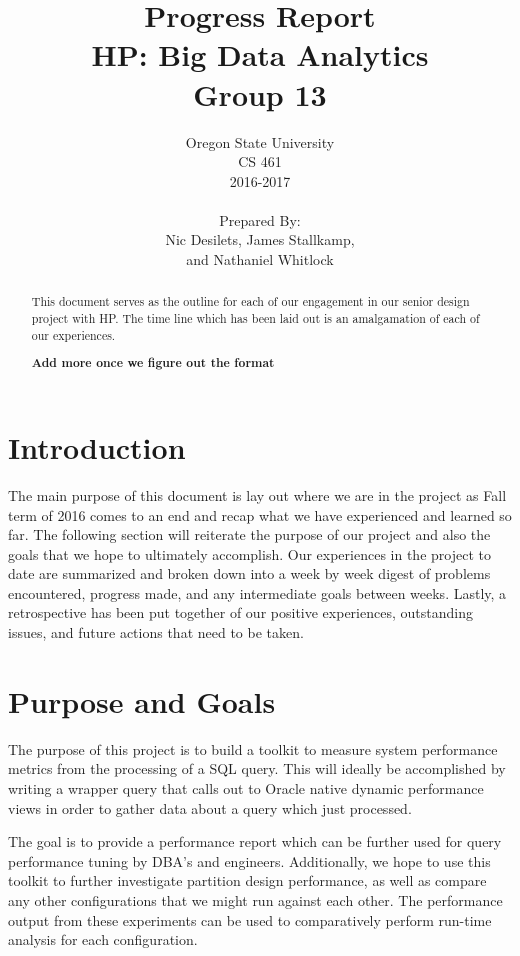 \documentclass[draftclsnofoot, onecolumn, compsoc, 10pt]{IEEEtran}
\title{\Huge Progress Report\\\large HP: Big Data Analytics\\Group 13}
\author{Oregon State University\\CS 461\\2016-2017\\\\Prepared By:\\Nic Desilets, James Stallkamp,\\and Nathaniel Whitlock}
\begin{document}
\begin{titlingpage}
    \maketitle 
    
    \vspace{1in}
    \begin{abstract}
		\noindent This document serves as the outline for each of our engagement in our senior design project with HP. The time line which has been laid out is an amalgamation of each of our experiences.
        
        \bf{Add more once we figure out the format}
    \end{abstract}
\end{titlingpage}

{\small\tableofcontents} %
\pagebreak

\section{Introduction}
The main purpose of this document is lay out where we are in the project as Fall term of 2016 comes to an end and recap what we have experienced and learned so far. The following section will reiterate the purpose of our project and also the goals that we hope to ultimately accomplish. Our experiences in the project to date are summarized and broken down into a week by week digest of problems encountered, progress made, and any intermediate goals between weeks. Lastly, a retrospective has been put together of our positive experiences, outstanding issues, and future actions that need to be taken. 

\section{Purpose and Goals}
The purpose of this project is to build a toolkit to measure system performance metrics from the processing of a SQL query.
This will ideally be accomplished by writing a wrapper query that calls out to Oracle native dynamic performance views in order to gather data about a query which just processed.

The goal is to provide a performance report which can be further used for query performance tuning by DBA's and engineers. Additionally, we hope to use this toolkit to further investigate partition design performance, as well as compare any other configurations that we might run against each other. The performance output from these experiments can be used to comparatively perform run-time analysis for each configuration.
\end{document}
